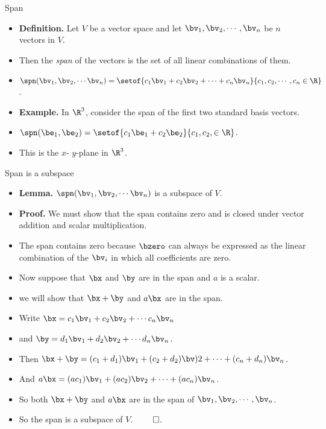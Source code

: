 \documentclass{beamer}
\begin{document}
\begin{frame}{Span}

\begin{itemize}
\item \textbf{Definition.} Let $V$ be a vector space and let $\bv_1,\bv_2,\cdots,\bv_n$ be $n$ vectors in $V$.
\item Then the \emph{span} of the vectors is the set of all linear combinations of them.
\item $\spn(\bv_1,\bv_2,\cdots\bv_n)=\setof{c_1\bv_1+c_2\bv_2+\cdots+c_n\bv_n}{c_1,c_2,\cdots,c_n\in\R}$.
\item \textbf{Example.} In $\R^3$, consider the span of the first two standard basis vectors.
\item $\spn(\be_1,\be_2) = \setof{c_1\be_1+c_2\be_2}{c_1,c_2,\in\R}$.
\item This is the $x$- $y$-plane in $\R^3$.
\end{itemize}

\end{frame}

\begin{frame}{Span is a subspace}

\begin{itemize}
\item \textbf{Lemma.} $\spn(\bv_1,\bv_2,\cdots\bv_n)$ is a subspace of $V$.
\item \textbf{Proof.} We must show that the span contains zero and is closed under vector addition
and scalar multiplication.
\item The span contains zero because $\bzero$ can always be expressed as the linear combination
of the $\bv_i$ in which all coefficients are zero.
\item Now suppose that $\bx$ and $\by$ are in the span and $a$ is a scalar.
\item we will show that $\bx+\by$ and $a \bx$ are in the span.
\item Write $\bx = c_1\bv_1 + c_2\bv_2 + \cdots c_n \bv_n$
\item and $\by = d_1\bv_1 + d_2\bv_2 + \cdots d_n \bv_n$.
\item Then $\bx + \by = (c_1 + d_1) \bv_1 + (c_2 +d_2)\bv)2 + \cdots + (c_n+d_n)\bv_n$.
\item And $a\bx = (ac_1)\bv_1 + (ac_2)\bv_2 + \cdots + (ac_n)\bv_n$.
\item So both $\bx+\by$ and $a\bx$ are in the span of $\bv_1,\bv_2,\cdots,\bv_n$.
\item So the span is a subspace of $V$. $\qed$.
\end{itemize}
\end{frame}
\end{document}
